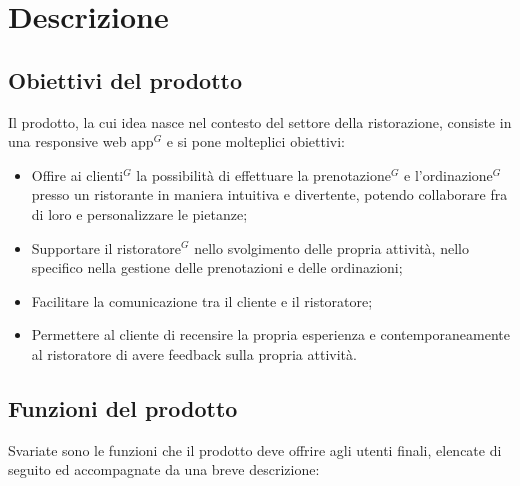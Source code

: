\section{Descrizione}
\subsection{Obiettivi del prodotto}

Il prodotto, la cui idea nasce nel contesto del settore della ristorazione,
 consiste in una responsive web app$^{G}$ e si pone molteplici obiettivi:
\begin{itemize}
    \item Offire ai clienti$^{G}$ la possibilità di effettuare la prenotazione$^{G}$ e l'ordinazione$^{G}$ presso un ristorante in maniera intuitiva e divertente, potendo collaborare fra di loro e personalizzare le pietanze;
    \item Supportare il ristoratore$^{G}$ nello svolgimento delle propria attività, nello specifico nella gestione delle prenotazioni e delle ordinazioni;
    \item Facilitare la comunicazione tra il cliente e il ristoratore;
    \item Permettere al cliente di recensire la propria esperienza e contemporaneamente al ristoratore di avere feedback sulla propria attività.
\end{itemize}

\subsection{Funzioni del prodotto}

Svariate sono le funzioni che il prodotto deve offrire agli utenti finali,
elencate di seguito ed accompagnate da una breve descrizione:

